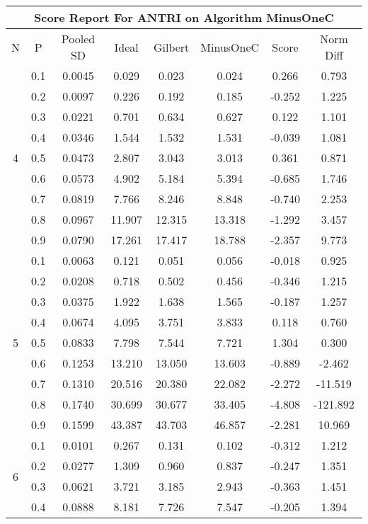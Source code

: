 \documentclass[11pt,a4paper]{report}
\begin{document}
\begin{longtable}{ | c | c || c | c | c | c | c | c | }
\hline
\multicolumn{8}{|c|}{ Score Report For ANTRI on Algorithm MinusOneC} \\
\hline
N & P & Pooled SD &  Ideal &  Gilbert & MinusOneC  & Score & Norm Diff \\
 \hline
 \hline
 \endhead
\multirow{9}{*}{4} & 0.1 & 0.0045 & 0.029 & 0.023 & 0.024 & 0.266 & 0.793 \\
 & 0.2 & 0.0097 & 0.226 & 0.192 & 0.185 & -0.252 & 1.225 \\
 & 0.3 & 0.0221 & 0.701 & 0.634 & 0.627 & 0.122 & 1.101 \\
 & 0.4 & 0.0346 & 1.544 & 1.532 & 1.531 & -0.039 & 1.081 \\
 & 0.5 & 0.0473 & 2.807 & 3.043 & 3.013 & 0.361 & 0.871 \\
 & 0.6 & 0.0573 & 4.902 & 5.184 & 5.394 & -0.685 & 1.746 \\
 & 0.7 & 0.0819 & 7.766 & 8.246 & 8.848 & -0.740 & 2.253 \\
 & 0.8 & 0.0967 & 11.907 & 12.315 & 13.318 & -1.292 & 3.457 \\
 & 0.9 & 0.0790 & 17.261 & 17.417 & 18.788 & -2.357 & 9.773 \\
 \hline
\multirow{9}{*}{5} & 0.1 & 0.0063 & 0.121 & 0.051 & 0.056 & -0.018 & 0.925 \\
 & 0.2 & 0.0208 & 0.718 & 0.502 & 0.456 & -0.346 & 1.215 \\
 & 0.3 & 0.0375 & 1.922 & 1.638 & 1.565 & -0.187 & 1.257 \\
 & 0.4 & 0.0674 & 4.095 & 3.751 & 3.833 & 0.118 & 0.760 \\
 & 0.5 & 0.0833 & 7.798 & 7.544 & 7.721 & 1.304 & 0.300 \\
 & 0.6 & 0.1253 & 13.210 & 13.050 & 13.603 & -0.889 & -2.462 \\
 & 0.7 & 0.1310 & 20.516 & 20.380 & 22.082 & -2.272 & -11.519 \\
 & 0.8 & 0.1740 & 30.699 & 30.677 & 33.405 & -4.808 & -121.892 \\
 & 0.9 & 0.1599 & 43.387 & 43.703 & 46.857 & -2.281 & 10.969 \\
 \hline
\multirow{9}{*}{6} & 0.1 & 0.0101 & 0.267 & 0.131 & 0.102 & -0.312 & 1.212 \\
 & 0.2 & 0.0277 & 1.309 & 0.960 & 0.837 & -0.247 & 1.351 \\
 & 0.3 & 0.0621 & 3.721 & 3.185 & 2.943 & -0.363 & 1.451 \\
 & 0.4 & 0.0888 & 8.181 & 7.726 & 7.547 & -0.205 & 1.394 \\

\end{longtable}
\end{document}
